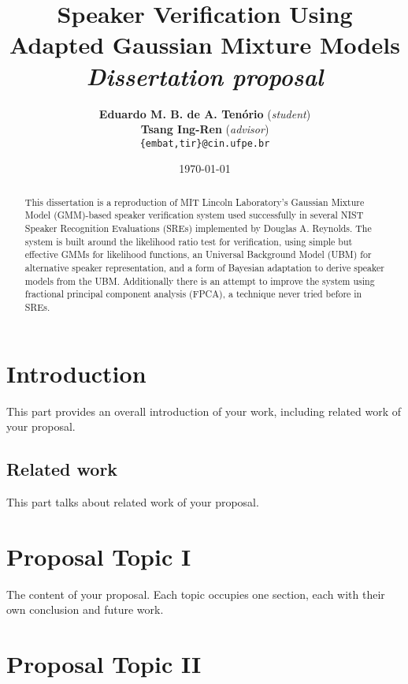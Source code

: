 \documentclass[12pt]{article}
\title{\textbf{Speaker Verification Using Adapted Gaussian Mixture Models}\\
\textit{Dissertation proposal}}
\author{
    \textbf{Eduardo M. B. de A. Tenório} (\textit{student})\\
    \textbf{Tsang Ing-Ren} (\textit{advisor})\\
    \small{\texttt{\{embat,tir\}@cin.ufpe.br}}
}
\affil{
    Centro de Informática\\
    Universidade Federal de Pernambuco\\
}
\date{\today}
\begin{document}
\pagestyle{plain}
\maketitle
\pagebreak  %

\begin{abstract}

This dissertation is a reproduction of MIT Lincoln Laboratory's Gaussian Mixture Model (GMM)-based speaker verification system used successfully in several NIST Speaker Recognition Evaluations (SREs) implemented by Douglas A. Reynolds. The system is built around the likelihood ratio test for verification, using simple but effective GMMs for likelihood functions, an Universal Background Model (UBM) for alternative speaker representation, and a form of Bayesian adaptation to derive speaker models from the UBM. Additionally there is an attempt to improve the system using fractional principal component analysis (FPCA), a technique never tried before in SREs.

\end{abstract}

\pagebreak  %

\tableofcontents

\pagebreak  %

\cleardoublepage

\section{Introduction}
\label{ch:intro}

This part provides an overall introduction of your work, including
related work of your proposal.

\subsection{Related work}
\label{ch:related}

This part talks about related work of your proposal.

\section{Proposal Topic I}
\label{ch:proposal}

The content of your proposal. Each topic occupies one section, each
with their own conclusion and future work.

\section{Proposal Topic II}
\label{ch:proposal}
\end{document}
